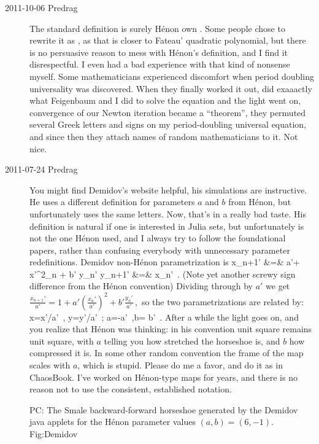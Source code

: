 \begin{description}
\item[2011-10-06 Predrag]
The standard definition is surely H\'enon own .
Some people chose to rewrite it as , as that is closer to
Fateau' quadratic polynomial, but there is no persuasive reason to mess
with H\'enon's definition, and I find it disrespectful. I even had a bad
experience with that kind of nonsense myself. Some mathematicians
experienced discomfort when period doubling universality was discovered.
When they finally worked it out, did exaaactly what Feigenbaum and I did
to solve the equation and the light went on, convergence of our Newton
iteration became a ``theorem'', they permuted several Greek letters and
signs on my period-doubling universal equation, and since then they
attach names of random mathematicians to it. Not nice.

\item[2011-07-24 Predrag]
                                    \toCB
You might find Demidov's website helpful, his simulations
are instructive. He uses a different definition for parameters $a$ and
$b$ from H\'enon, but unfortunately uses the same letters. Now, that's in
a really bad taste. His definition is natural if one is interested in
Julia sets, but unfortunately is not the one H\'enon used, and I always
try to follow the foundational papers, rather than confusing everybody
with unnecessary parameter redefinitions. Demidov
non-H\'enon  parametrization is
\bea
    x_{n+1}' &=& a'+ {x'}{}^2_n + b' y_n'
        \continue
    y_{n+1}' &=& x_n'
\,.
\label{DemidHen}
\eea
(Note yet another screwy sign difference from the H\'enon convention)
Dividing through by $a'$ we get
\(
\frac{x_{n+1}'}{a'} = 1 + a'\left(\frac{x_n'}{a'}\right)^2 + b'\frac{y_n'}{a'}
\,,
\)
so the two parametrizations are related by:
\beq
x={x'}/{a'}
\,,\quad
y={y'}/{a'}
\,;\qquad
a=-{a'}
\,,\quad b= {b'}
\,.
After a while the light goes on, and you realize that H\'enon was
thinking: in his convention unit square remains unit square, with $a$
telling you how stretched the horseshoe is, and $b$ how compressed it is.
In some other random convention the frame of the map scales with $a$,
which is stupid. Please do me a favor, and do it as in ChaosBook. I've
worked on H\'enon-type maps for years, and there is no reason not to use
the consistent, established notation.

{}{
PC: The Smale backward-forward horseshoe generated by the
Demidov java applets for the H\'enon parameter values
$(a,b) = (6,-1)$.
    }{Fig:Demidov}


\end{description}
